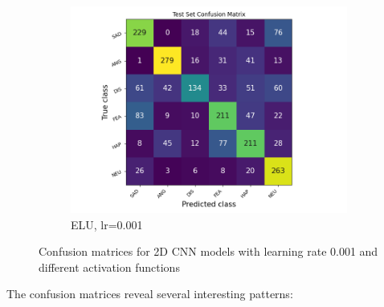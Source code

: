 \begin{figure}[h]
\begin{subfigure}[b]{0.32\textwidth}
        \includegraphics[width=\textwidth]{2D/lr0.001-ELU-2D-CF.png}
        \caption{ELU, lr=0.001}
    \end{subfigure}
    \caption{Confusion matrices for 2D CNN models with learning rate 0.001 and different activation functions}
    \label{fig:2d_confusion_matrices}
\end{figure}

The confusion matrices reveal several interesting patterns:

